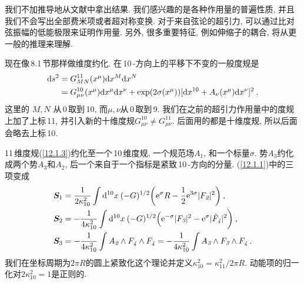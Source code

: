 我们不加推导地从文献中拿出结果. 我们感兴趣的是各种作用量的普遍性质, 并且我们不会写出全部费米项或者超对称变换. 对于来自弦论的超引力, 可以通过比对弦振幅的低能极限来证明作用量. 另外, 很多重要特征, 例如伸缩子的耦合, 将从更一般的推理来理解.

现在像\,8.1\,节那样做维度约化. 在\,10\,-方向上的平移下不变的一般度规是
\begin{align}
    \mathrm{d} s^{2} &= G_{MN}^{11}(x^{\mu})\mathrm{d} x^{M}\mathrm{d} x^{N} \nonumber \\
    &= G_{\mu\nu}^{10}(x^{\mu})\mathrm{d} x^{\mu}\mathrm{d} x^{\nu} + \exp(2\sigma(x^{\mu}))[\mathrm{d} x^{10}+A_{\nu}(x^{\mu})\mathrm{d} x^{\nu}]^{2} \:. \label{12.1.3}
\end{align}
这里的 $M,N$ 从\,0\,取到\,10, 而$ \mu,\nu $从\,0\,取到\,9. 我们在之前的超引力作用量中的度规上加了上标\,11, 并引入新的十维度规$ G_{\mu\nu}^{10}\neq G_{\mu\nu}^{11}$. 后面用的都是十维度规, 所以后面会略去上标\,10.

11\,维度规(\ref{12.1.3})约化至一个\,10\,维度规, 一个规范场$ A_{\textit{1}}$, 和一个标量$ \sigma$. 势$ A_{\textit{3}} $约化成两个势$ A_{\textit{3}} $和$ A_{\textit{2}}$, 后一个来自于一个指标是紧致\,10\,-方向的分量. (\ref{12.1.1})中的三项变成
\begin{subequations} \label{12.1.4}
    \begin{align}
        \bm{S}_{1} &=\frac{1}{2\kappa_{10}^{2}}\int \mathrm{d}^{10}x\:(-G)^{1/2}\biggl(\mathrm{e}^{\sigma}R-\frac{1}{2}\mathrm{e}^{3\sigma}\lvert F_{\textit{2}}\rvert^{2}\biggr) \:, \label{12.1.4a} \\
        \bm{S}_{2} &=-\frac{1}{4\kappa_{10}^{2}}\int \mathrm{d}^{10}x\:(-G)^{1/2}\Bigl(\mathrm{e}^{-\sigma}\lvert F_{\textit{3}}\rvert^{2}-\mathrm{e}^{\sigma}\lvert \tilde{F}_{\textit{4}}\rvert^{2}\biggr) \:, \label{12.1.4b} \\
         \bm{S}_{3} &= - \frac{1}{4\kappa_{10}^{2}}\int A_{\textit{2}}\wedge  F_{\textit{4}} \wedge F_{\textit{4}}
         = - \frac{1}{4\kappa_{10}^{2}}\int A_{\textit{3}}\wedge  F_{\textit{3}} \wedge F_{\textit{4}} \:. \label{12.1.4c}
     \end{align}  
\end{subequations}
我们在坐标周期为$ 2\pi R $的圆上紧致化这个理论并定义$ \kappa_{10}^{2}=\kappa_{11}^{2}/2\pi R$. 动能项的归一化对$ 2\kappa_{10}^{2}=1 $是正则的.

